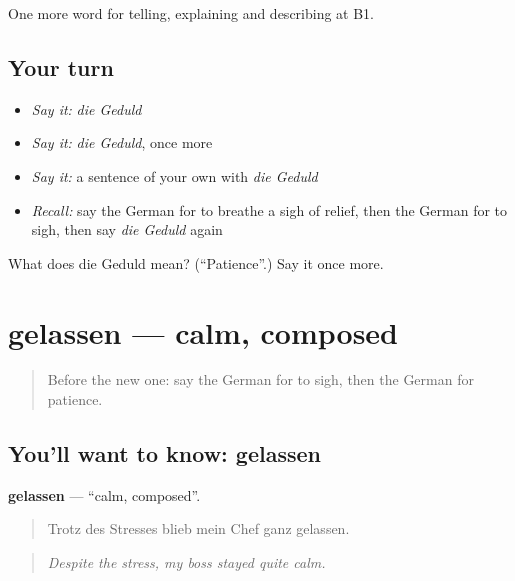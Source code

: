 \begin{grammarlens}[title={What you've built}]
One more word for telling, explaining and describing at B1.
\end{grammarlens}

\subsection*{Your turn}
\begin{itemize}
\raggedright
  \item \emph{Say it:} \emph{die Geduld}
  \item \emph{Say it:} \emph{die Geduld}, once more
  \item \emph{Say it:} a sentence of your own with \emph{die Geduld}
  \item \emph{Recall:} say the German for to breathe a sigh of relief, then the German for to sigh, then say \emph{die Geduld} again
\end{itemize}

\begin{tcolorbox}[breakable,colback=teal!4,colframe=teal!35!black,title={Before you move on}]
What does die Geduld mean? (\textquotedblleft{}Patience\textquotedblright{}.) Say it once more.
\end{tcolorbox}
\section[gelassen]{gelassen — calm, composed}

\label{lesson:GE-C470-gelassen}



\begin{quote}
Before the new one: say the German for to sigh, then the German for patience.
\end{quote}

\subsection*{You'll want to know: gelassen}
\textbf{gelassen} — \textquotedblleft{}calm, composed\textquotedblright{}.

\begin{quote}
Trotz des Stresses blieb mein Chef ganz gelassen.
\end{quote}

\begin{quote}
\emph{Despite the stress, my boss stayed quite calm.}
\end{quote}

